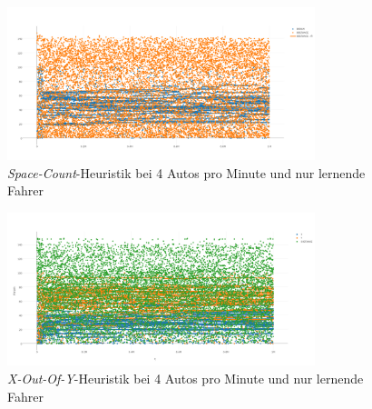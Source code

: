 \begin{figure}[H]
	\includegraphics[width=0.8\textwidth]{analyse/JustHeuristik/4pm/space4just.png}
	\caption{\emph{Space-Count}-Heuristik bei 4 Autos pro Minute und nur lernende Fahrer}\label{fig:ap_jh_sc_4}
\end{figure}
\begin{figure}[H]
	\includegraphics[width=0.8\textwidth]{analyse/JustHeuristik/4pm/xy.png}
	\caption{\emph{X-Out-Of-Y}-Heuristik bei 4 Autos pro Minute und nur lernende Fahrer}\label{fig:ap_jh_xy_4}
\end{figure}